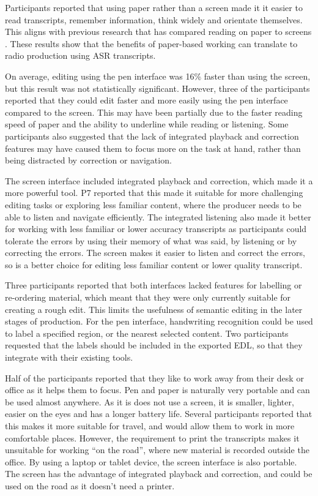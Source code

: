 Participants reported that using paper rather than a screen made it it easier to read transcripts, remember
information, think widely and orientate themselves. This aligns with previous research that has compared reading on
paper to screens \citep{OHara1997,Kurniawan2001,Mangen2013,Singer2017}. These results show that the benefits of
paper-based working can translate to radio production using ASR transcripts.

On average, editing using the pen interface was 16\% faster than using the screen, but this result was not
statistically significant.
However, three of the participants reported that they could edit faster and more easily using the pen interface compared to the
screen.
This may have been partially due to the faster reading speed of paper and the ability to underline while reading or
listening.  Some participants also suggested that the lack of integrated playback and correction features may have
caused them to focus more on the task at hand, rather than being distracted by correction or navigation.

The screen interface included integrated playback and correction, which made it a more powerful tool.  P7 reported that
this made it suitable for more challenging editing tasks or exploring less familiar content, where the producer needs
to be able to listen and navigate efficiently. The integrated listening also made it better for working with less
familiar or lower accuracy transcripts as participants could tolerate the errors by using their memory of what was
said, by listening or by correcting the errors. The screen makes it easier to listen and correct the errors, so is a
better choice for editing less familiar content or lower quality transcript. 


Three participants reported that both interfaces lacked features for labelling or re-ordering material, which meant
that they were only currently suitable for creating a rough edit. This limits the usefulness of semantic editing in the
later stages of production. For the pen interface, handwriting recognition could be used to label a specified region,
or the nearest selected content. Two participants requested that the labels should be included in the exported EDL, so
that they integrate with their existing tools.

Half of the participants reported that they like to work away from their desk or office as it helps them to focus. Pen
and paper is naturally very portable and can be used almost anywhere. As it is does not use a screen, it is smaller,
lighter, easier on the eyes and has a longer battery life. Several participants reported that this makes it more
suitable for travel, and would allow them to work in more comfortable places. However, the requirement to print the
transcripts makes it unsuitable for working ``on the road'', where new material is recorded outside the office. By
using a laptop or tablet device, the screen interface is also portable. The screen has the advantage of
integrated playback and correction, and could be used on the road as it doesn't need a printer.

